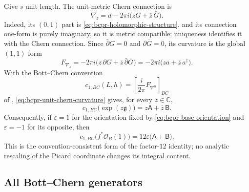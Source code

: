 Give $s$ unit length.  The unit-metric Chern connection is
\begin{equation}
 \nabla_z=d-2\pi i\bigl(zG+\bar z\,\bar G\bigr).
\label{eq:bcpr-unit-chern-connection}
\end{equation}
Indeed, its $(0,1)$ part is
\cref{eq:bcpr-holomorphic-structure}, and its connection one-form is
purely imaginary, so it is metric compatible; uniqueness identifies it
with the Chern connection.  Since $\bar\partial G=0$ and
$\partial\bar G=0$, its curvature is the global $(1,1)$ form
\begin{equation}
 F_{\nabla_z}
 =-2\pi i\bigl(z\,\partial G+
                 \bar z\,\bar\partial\bar G\bigr)
 =-2\pi i\bigl(za+\bar z\,a^\dagger\bigr).
\label{eq:bcpr-unit-chern-curvature}
\end{equation}
With the Bott--Chern convention
\begin{equation}
 c_{1,BC}(L,h)=
 \left[\frac{i}{2\pi}F_{\nabla^h}\right]_{BC}
\label{eq:bcpr-chern-convention}
\end{equation}
of \cite[\S8.a]{Schweitzer2007},
\cref{eq:bcpr-unit-chern-curvature} gives, for every $z\in\mathbb C$,
\begin{equation}
 c_{1,BC}\bigl(\exp(z\mathfrak g)\bigr)
 =z\mathsf A+\bar z\,\mathsf B.
\label{eq:bcpr-chern-exp-identity}
\end{equation}
Consequently, if $\varepsilon=1$ for the orientation fixed by
\cref{eq:bcpr-base-orientation} and $\varepsilon=-1$ for its opposite,
then
\begin{equation}
 c_{1,BC}\bigl(f^*\mathcal O_B(1)\bigr)
 =12\varepsilon\bigl(\mathsf A+\mathsf B\bigr).
\label{eq:bcpr-c1-pullback}
\end{equation}
This is the convention-consistent form of the factor-$12$ identity; no
analytic rescaling of the Picard coordinate changes its integral content.

\subsection{All Bott--Chern generators}

